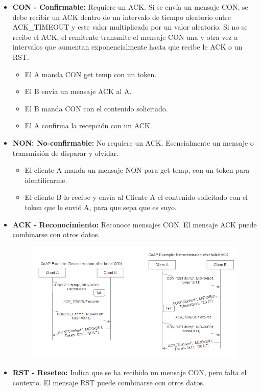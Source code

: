 \documentclass[12pt]{report} %
\begin{document}
\begin{itemize}
	\item \textbf{CON - Confirmable:} Requiere un ACK. Si se envía un mensaje CON, se debe recibir un ACK dentro de un intervalo de tiempo aleatorio entre ACK\_TIMEOUT y este valor multiplicado por un valor aleatorio. Si no se recibe el ACK, el remitente transmite el mensaje CON una y otra vez a intervalos que aumentan exponencialmente hasta que recibe le ACK o un RST.
	\begin{itemize}
		\item El A manda CON get \/temp con un token. 
		\item El B envía un mensaje ACK al A.
		\item El B manda CON con el contenido solicitado.
		\item El A confirma la recepción con un ACK.
	\end{itemize}
	\item \textbf{NON: No-confirmable:} No requiere un ACK. Esencialmente un mensaje o transmisión de disparar y olvidar.
	\begin{itemize}
		\item El cliente A manda un mensaje NON para get \/temp, con un token para identificarme.
		\item El cliente B lo recibe y envía al Cliente A el contenido solicitado con el token que le envió A, para que sepa que es suyo.
	\end{itemize}
	\item \textbf{ACK - Reconocimiento:} Reconoce mensajes CON. El mensaje ACK puede combinarse con otros datos.
	\begin{figure}[H]
		{\includegraphics[scale=.48]{b15b5a2c-b9bc-4099-8786-a2bb1272ac9c.png}}
	\end{figure}
	\item \textbf{RST - Reseteo:} Indica que se ha recibido un mensaje CON, pero falta el contexto. El mensaje RST puede combinarse con otros datos.
\end{itemize}
\end{document}
